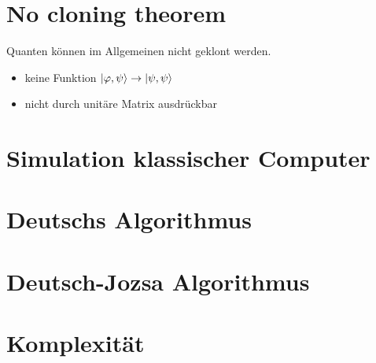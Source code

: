 \documentclass[xcolor=colortbl
]{beamer}
\begin{document}
\begin{frame}
    \pictureHadamard
\end{frame}

\section{No cloning theorem}
\begin{frame}
    \begin{fact}
        Quanten können im Allgemeinen nicht geklont werden.
    \end{fact}
    \begin{itemize}
        \item keine Funktion $\left|\varphi,\psi\right\rangle \rightarrow \left|\psi,\psi\right\rangle$
        \item nicht durch unitäre Matrix ausdrückbar

    \end{itemize}
\end{frame}
\section{Simulation klassischer Computer}

\begin{frame}
    \pictureToffoli
\end{frame}


\section{Deutschs Algorithmus}
\begin{frame}
    \pictureDeutschAlgo
\end{frame}
\section{Deutsch-Jozsa Algorithmus}

\section{Komplexität}
\begin{frame}
\end{frame}
\end{document}
